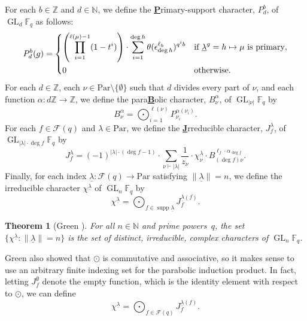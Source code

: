 \documentclass[10pt]{article}
\newtheorem{theorem}{Theorem}[section]
\theoremstyle{definition}
\DeclareMathOperator{\GL}{GL}
\DeclareMathOperator{\supp}{supp}
\newcommand{\F}{\mathbb{F}}
\newcommand{\CF}{\mathcal{F}}
\newcommand{\N}{\mathbb{N}}
\newcommand{\Z}{\mathbb{Z}}
\newcommand{\eps}{\epsilon}
\newcommand{\Par}{\text{Par}}
\newcommand{\ulambda}{{\underline{\lambda}}}
\newcommand{\uline}[1]{{\underline{#1}}}
\newcommand{\te}{\theta}
\begin{document}
For each $b \in \Z$ and $d \in \N$, we define the \uline{\textbf{P}}rimary-support character, $P_d^b$, of $\GL_d \F_q$ as follows:
\begin{equation}
\label{P_chars}
P_d^b (g) = \begin{dcases} \left ( \prod_{i=1}^{\ell(\mu) - 1} (1-t^i) \right ) \cdot \sum_{i=1}^{\deg h} \te(\eps_{\deg h}^{\ell_h})^{q^i b} & \text{if } \ulambda^g = h \mapsto \mu \text{ is primary}, \\ 0 & \text{otherwise.} \end{dcases}
\end{equation}
For each \(d \in \Z\), each $\nu \in \Par \setminus \{\emptyset\}$ such that \(d\) divides every part of \(\nu\), and each function $\alpha : d \Z \to \Z$, we define the para\uline{\textbf{B}}olic character, $B_\nu^\alpha$, of $\GL_{|\nu|} \F_q$ by
\begin{equation}
\label{B_chars}
B_\nu^\alpha = \bigodot_{i = 1}^{\ell(\nu)} P_{\nu_i}^{\alpha(\nu_i)}. \end{equation}
For each $f \in \CF (q)$ and $\lambda \in \Par$, we define the \uline{\textbf{J}}rreducible character, $J_f^\lambda$, of $\GL_{|\lambda| \cdot \deg f} \F_q$
by
\begin{equation}
\label{jrreducible}
J_f^\lambda
=
(-1)^{|\lambda| \cdot (\deg f - 1)} \cdot \sum_{\nu \vdash |\lambda|} \frac{1}{z_\nu} \cdot \chi^\lambda_\nu \cdot B^{\ell_f \cdot \alpha_{\deg f}}_{(\deg f) \nu}.
\end{equation}
Finally, for each index $\ulambda : \CF (q) \to \Par$ satisfying $\| \ulambda \| = n$, we define the irreducible character $\chi^\ulambda$ of $\GL_n \F_q$
by
\begin{equation} \label{grand_finale} \chi^{\ulambda} = \bigodot_{f \in \supp \ulambda} J_f^{\ulambda(f)}. \end{equation}

\begin{theorem}[Green {\cite[Theorem~14]{green}}]
\label{greens_main_thm}
For all \(n \in \N\) and prime powers~\(q\), the set $\{ \chi^\ulambda : \| \ulambda \| = n\}$ is the set of distinct, irreducible, complex characters of $\GL_n \F_q$.
\end{theorem}

Green also showed that $\odot$ is commutative and associative, so it makes sense to use an arbitrary finite indexing set for the parabolic induction product. In fact, letting $J_f^\emptyset$ denote the empty function, which is the identity element with respect to $\odot$, we can define
\begin{equation}
\chi^\ulambda = \bigodot_{f \in \CF (q)} J_f^{\ulambda(f)}.
\end{equation}
\end{document}
